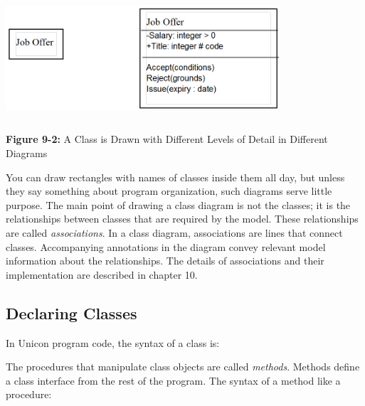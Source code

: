 \bigskip

\includegraphics[width=4in,height=1.8in]{ub-img/lodetail.png} 

{\sffamily\bfseries Figure 9-2:}
{\sffamily A Class is Drawn with Different Levels of Detail in
 Different Diagrams}

\bigskip

You can draw rectangles with names of classes inside them all day, but
unless they say something about program organization, such diagrams
serve little purpose. The main point of drawing a class diagram is not
the classes; it is the relationships between classes that are required
by the model. These relationships are called
\textit{associations}. In a class diagram,
associations are lines that connect classes. Accompanying annotations
in the diagram convey relevant model information about the
relationships. The details of associations and their implementation are
described in chapter 10.

\subsection[Declaring Classes]{Declaring Classes}
In Unicon program code, the syntax of a class
is: 


\noindent
The procedures that manipulate class objects are called
\textit{methods}. Methods define a
class{\textquotesingle} interface from the rest of the program. The
syntax of a method like a procedure: 


